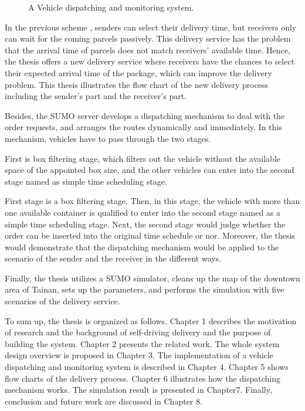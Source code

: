 \documentclass[12pt]{ksthesis}
\begin{document}
\begin{thesis}
{\begin{figure}[t!]
\caption{\large A Vehicle dispatching and monitoring system.}
\vspace{0.5cm}
\label{Fig:System_Overview}
\end{figure}

In the previous scheme \cite{Jiang2018}, senders can select their delivery time, but receivers only can wait for the coming parcels passively. This delivery service has the problem that the arrival time of parcels does not match receivers’ available time. Hence, the thesis offers a new delivery service where receivers have the chances to select their expected arrival time of the package, which can improve the delivery problem. This thesis illustrates the flow chart of the new delivery process including the sender’s part and the receiver’s part.

Besides, the SUMO server develops a dispatching mechanism to deal with the order requests, and arranges the routes dynamically and immediately. In this mechanism, vehicles have to pass through the two stages. 

First is box filtering stage, which filters out the vehicle without the available space of the appointed box size, and the other vehicles can enter into the second stage named as simple time scheduling stage. 

First stage is a box filtering stage. Then, in this stage, the vehicle with more than one available container is qualified to enter into the second stage named as a simple time scheduling stage. Next, the second stage would judge whether the order can be inserted into the original time schedule or nor. Moreover, the thesis would demonstrate that the dispatching mechanism would be applied to the scenario of the sender and the receiver in the different ways.

Finally, the thesis utilizes a SUMO simulator, cleans up the map of the downtown area of Tainan, sets up the parameters, and performs the simulation with five scenarios of the delivery service.

To sum up, the thesis is organized as follows. Chapter 1 describes the motivation of research and the background of self-driving delivery and the purpose of building the system. Chapter 2 presents the related work. The whole system design overview is proposed in Chapter 3. The implementation of a vehicle dispatching and monitoring system is described in Chapter 4. Chapter 5 shows flow charts of the delivery process.  Chapter 6 illustrates how the dispatching mechanism works. The simulation result is presented in Chapter7. Finally, conclusion and future work are discussed in Chapter 8.


}
\end{thesis}
\end{document}
